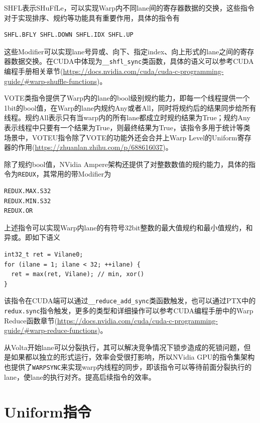SHFL表示SHuFfLe，可以实现Warp内不同lane间的寄存器数据的交换，这些指令对于实现排序、规约等功能具有重要作用，具体的指令有

\begin{lstlisting}
SHFL.BFLY SHFL.DOWN SHFL.IDX SHFL.UP
\end{lstlisting}

这些Modifier可以实现lane号异或、向下、指定index、向上形式的lane之间的寄存器数据交换。在CUDA中体现为\lstinline|__shfl_sync|类函数，具体的语义可以参考CUDA编程手册相关章节(\url{https://docs.nvidia.com/cuda/cuda-c-programming-guide/#warp-shuffle-functions})。

VOTE类指令提供了Warp内的lane的bool级别规约能力，即每一个线程提供一个1bit的bool值，在Warp的lane内规约Any或者All，同时将规约后的结果同步给所有线程。规约All表示只有当warp内的所有lane都成立时规约结果为True；规约Any表示线程中只要有一个结果为True，则最终结果为True，该指令多用于统计等类场景中，VOTEU指令除了VOTE的功能外还会合并上Warp Level的Uniform寄存器的作用(\url{https://zhuanlan.zhihu.com/p/688616037})。

除了规约bool值，NVidia Ampere架构还提供了对整数数值的规约能力，具体的指令为\lstinline|REDUX|，其常用的带Modifier为

\begin{lstlisting}
REDUX.MAX.S32
REDUX.MIN.S32
REDUX.OR
\end{lstlisting}

上述指令可以实现Warp内lane的有符号32bit整数的最大值规约和最小值规约，和异或。即如下语义

\begin{lstlisting}
int32_t ret = Vilane0;
for (ilane = 1; ilane < 32; ++ilane) {
  ret = max(ret, Vilane); // min, xor()
}
\end{lstlisting}

该指令在CUDA端可以通过\lstinline|__reduce_add_sync|类函数触发，也可以通过PTX中的\lstinline|redux.sync|指令触发，更多的类型和详细操作可以参考CUDA编程手册中的Warp Reduce函数章节(\url{https://docs.nvidia.com/cuda/cuda-c-programming-guide/#warp-reduce-functions})。

从Volta开始lane可以分裂执行，其可以解决竞争情况下锁步造成的死锁问题，但是如果都以独立的形式运行，效率会受很打影响，所以NVidia GPU的指令集架构也提供了\lstinline|WARPSYNC|来实现warp内线程的同步，即该指令可以等待前面分裂执行的lane，使lane的执行对齐。提高后续指令的效率。

\section{Uniform指令}

